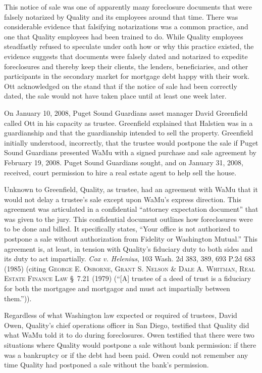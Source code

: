 This notice of sale was one of apparently many foreclosure documents
that were falsely notarized by Quality and its employees around that time.
There was considerable evidence that falsifying notarizations was a common
practice, and one that Quality employees had been trained to do. While Quality
employees steadfastly refused to speculate under oath how or why this practice
existed, the evidence suggests that documents were falsely dated and notarized
to expedite foreclosures and thereby keep their clients, the lenders,
beneficiaries, and other participants in the secondary market for mortgage debt
happy with their work. Ott acknowledged on the stand that if the notice of sale
had been correctly dated, the sale would not have taken place until at least
one week later.

On January 10, 2008, Puget Sound Guardians asset manager David
Greenfield called Ott in his capacity as trustee. Greenfield explained that
Halstien was in a guardianship and that the guardianship intended to sell the
property. Greenfield initially understood, incorrectly, that the trustee would
postpone the sale if Puget Sound Guardians presented WaMu with a signed
purchase and sale agreement by February 19, 2008. Puget Sound Guardians sought,
and on January 31, 2008, received, court permission to hire a real estate agent
to help sell the house.

Unknown to Greenfield, Quality, as trustee, had an agreement with WaMu
that it would not delay a trustee's sale except upon WaMu's express direction.
This agreement was articulated in a confidential ``attorney expectation
document'' that was given to the jury. This confidential document outlines how
foreclosures were to be done and billed. It specifically states, ``Your office
is not authorized to postpone a sale without authorization from Fidelity or
Washington Mutual.'' This agreement is, at least, in tension with Quality's
fiduciary duty to both sides and its duty to act impartially. \emph{Cox v.
Helenius},
103 Wash. 2d 383, 389, 693 P.2d 683 (1985) (citing \textsc{George E. Osborne,
Grant S.
Nelson \& Dale A. Whitman, Real Estate Finance Law} \S~7.21 (1979) (``[A]
trustee of a deed of trust is a fiduciary for both the mortgagee and mortgagor
and must act impartially between them.'')).

Regardless of what Washington law expected or required of trustees,
David Owen, Quality's chief operations officer in San Diego, testified that
Quality did what WaMu told it to do during foreclosures. Owen testified that
there were two situations where Quality would postpone a sale without bank
permission: if there was a bankruptcy or if the debt had been paid. Owen could
not remember any time Quality had postponed a sale without the bank's
permission.

